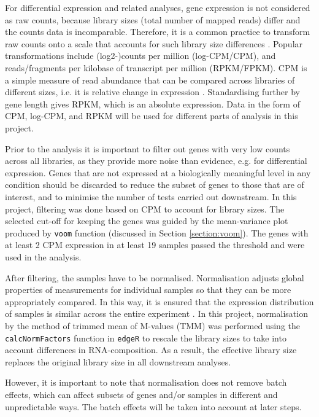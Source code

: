     For differential expression and related analyses, gene expression is not considered as raw counts, because library sizes (total number of mapped reads) differ and the counts data is incomparable. Therefore, it is a common practice to transform raw counts onto a scale that accounts for such library size differences \cite{law2016rna}. Popular transformations include (log2-)counts per million (log-CPM/CPM), and reads/fragments per kilobase of transcript per million (RPKM/FPKM). CPM is a simple measure of read abundance that can be compared across libraries of different sizes, i.e. it is relative change in expression \cite{Law2014}. Standardising further by gene length gives RPKM, which is an absolute expression. Data in the form of CPM, log-CPM, and RPKM will be used for different parts of analysis in this project. 
    
    Prior to the analysis it is important to filter out genes with very low counts across all libraries, as they provide more noise than evidence, e.g. for differential expression. Genes that are not expressed at a biologically meaningful level in any condition should be discarded to reduce the subset of genes to those that are of interest, and to minimise the number of tests carried out downstream. In this project, filtering was done based on CPM to account for library sizes. The selected cut-off for keeping the genes was guided by the mean-variance plot produced by \texttt{voom} function (discussed in Section \ref{section:voom}). The genes with at least 2 CPM expression in at least 19 samples passed the threshold and were used in the analysis.
    
    After filtering, the samples have to be normalised. Normalisation adjusts global properties of measurements for individual samples so that they can be more appropriately compared. In this way, it is ensured that the expression distribution of samples is similar across the entire experiment \cite{Robinson2010}. In this project, normalisation by the method of trimmed mean of M-values (TMM) \cite{RobinsonAData} was performed using the \texttt{calcNormFactors} function in \texttt{edgeR} to rescale the library sizes to take into account differences in RNA-composition. As a result, the effective library size replaces the original library size in all downstream analyses. 
    
    However, it is important to note that normalisation does not remove batch effects, which can affect subsets of genes and/or samples in different and unpredictable ways. The batch effects will be taken into account at later steps. 

